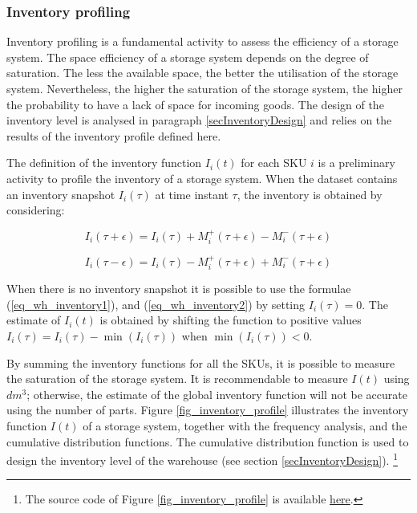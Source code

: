 \clearpage

\subsubsection{Inventory profiling}
Inventory profiling is a fundamental activity to assess the efficiency of a storage system. The space efficiency of a storage system depends on the degree of saturation. The less the available space, the better the utilisation of the storage system. Nevertheless, the higher the saturation of the storage system, the higher the probability to have a lack of space for incoming goods. The design of the inventory level is analysed in paragraph \ref{secInventoryDesign} and relies on the results of the inventory profile defined here.\par

The definition of the inventory function $I_i(t)$ for each SKU $i$ is a preliminary activity to profile the inventory of a storage system. When the dataset contains an inventory snapshot $I_i(\tau)$ at time instant $\tau$, the inventory is obtained by considering:

\begin{equation}
    I_i\left(\tau+\epsilon\right)=I_i\left(\tau\right)+M_i^+\left(\tau+\epsilon\right)-M_i^-(\tau+\epsilon)
    \label{eq_wh_inventory1}
\end{equation}

\begin{equation}
    I_i\left(\tau-\epsilon\right)=I_i\left(\tau\right)-M_i^+\left(\tau+\epsilon\right)+M_i^-(\tau+\epsilon)
    \label{eq_wh_inventory2}
\end{equation}

When there is no inventory snapshot it is possible to use the formulae (\ref{eq_wh_inventory1}), and (\ref{eq_wh_inventory2}) by setting $I_i\left(\tau\right)=0$. The estimate of $I_i\left(t\right)$ is obtained by shifting the function to positive values $I_i\left(\tau\right)=I_i\left(\tau\right)-\min(I_i\left(\tau\right))$ when $\min{\left(I_i\left(\tau\right)\right)}<0$.\par

By summing the inventory functions for all the SKUs, it is possible to measure the saturation of the storage system. It is recommendable to measure $I(t)$ using $dm^3$; otherwise, the estimate of the global inventory function will not be accurate using the number of parts. Figure \ref{fig_inventory_profile} illustrates the inventory function $I(t)$ of a storage system, together with the frequency analysis, and the cumulative distribution functions. The cumulative distribution function is used to design the inventory level of the warehouse (see section \ref{secInventoryDesign}). \footnote{The source code of Figure \ref{fig_inventory_profile} is available \href{https://github.com/aletuf93/logproj/blob/master/examples/WH_03\%20Warehouse\%20Inventory\%20assessment.ipynb}{here}.}


